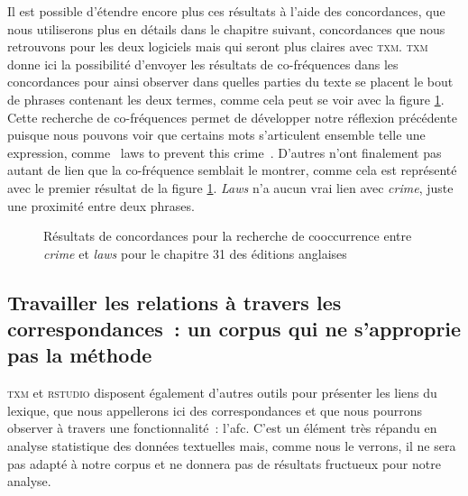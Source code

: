 Il est possible d'étendre encore plus ces résultats à l'aide des concordances, que nous utiliserons plus en détails dans le chapitre suivant, concordances que nous retrouvons pour les deux logiciels mais qui seront plus claires avec \textsc{txm}. \textsc{txm} donne ici la possibilité d'envoyer les résultats de co-fréquences dans les concordances pour ainsi observer dans quelles parties du texte se placent le bout de phrases contenant les deux termes, comme cela peut se voir avec la figure \ref{fig:concordances_laws_crime}. Cette recherche de co-fréquences permet de développer notre réflexion précédente puisque nous pouvons voir que certains mots s'articulent ensemble telle une expression, comme \og~laws to prevent this crime~\fg{}. D'autres n'ont finalement pas autant de lien que la co-fréquence semblait le montrer, comme cela est représenté avec le premier résultat de la figure \ref{fig:concordances_laws_crime}. \textit{Laws} n'a aucun vrai lien avec \textit{crime}, juste une proximité entre deux phrases. 
\begin{figure}[H]
    \centering
    \caption{Résultats de concordances pour la recherche de cooccurrence entre \textit{crime} et \textit{laws} pour le chapitre 31 des éditions anglaises}
    \label{fig:concordances_laws_crime}
\end{figure}

\subsection{Travailler les relations à travers les correspondances~: un corpus qui ne s'approprie pas la méthode}
\textsc{txm} et \textsc{rstudio} disposent également d'autres outils pour présenter les liens du lexique, que nous appellerons ici des correspondances et que nous pourrons observer à travers une fonctionnalité~: l'\acrlong{afc}. C'est un élément très répandu en analyse statistique des données textuelles mais, comme nous le verrons, il ne sera pas adapté à notre corpus et ne donnera pas de résultats fructueux pour notre analyse. \pagebreak

